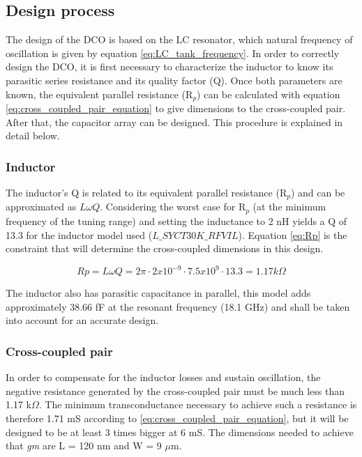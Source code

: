 \subsection{Design process}
The design of the DCO is based on the LC resonator, which natural frequency of oscillation is given by equation \eqref{eq:LC_tank_frequency}. In order to correctly design the DCO, it is
first necessary to characterize the inductor to know its parasitic series resistance and its quality factor (Q). Once both parameters are known, the equivalent parallel resistance (R$_p$) can
be calculated with equation \eqref{eq:cross_coupled_pair_equation} to give dimensions to the cross-coupled pair. After that, the capacitor array can be designed. This procedure is explained in detail below.

\subsubsection{Inductor}
The inductor's Q is related to its equivalent parallel resistance (R$_p$) and can be approximated as $L\omega Q$. Considering the worst case for R$_p$ (at the minimum frequency of the tuning range)
and setting the inductance to 2 nH yields a Q of 13.3 for the inductor model used ($L\_SYCT30K\_RFVIL$). Equation \eqref{eq:Rp} is the constraint that will determine the cross-coupled dimensions in this design.


\begin{equation}
    Rp = L \omega Q = 2 \pi \cdot 2 x 10^{-9} \cdot 7.5 x 10^{9} \cdot 13.3 = 1.17 k \Omega
    \label{eq:Rp}
\end{equation}

\vspace{1cm}

The inductor also has parasitic capacitance in parallel, this model adds approximately 38.66 fF at the resonant frequency (18.1 GHz) and shall be taken into account for an accurate design.

\subsubsection{Cross-coupled pair}

In order to compensate for the inductor losses and sustain oscillation, the negative resistance generated by the cross-coupled pair must be much less than 1.17 k$\Omega$. The minimum transconductance necessary
to achieve such a resistance is therefore 1.71 mS according to \eqref{eq:cross_coupled_pair_equation}, but it will be designed to be at least 3 times bigger at 6 mS. The dimensions needed to achieve that \textit{gm}
are L = 120 nm and W = 9 $\mu$m.

